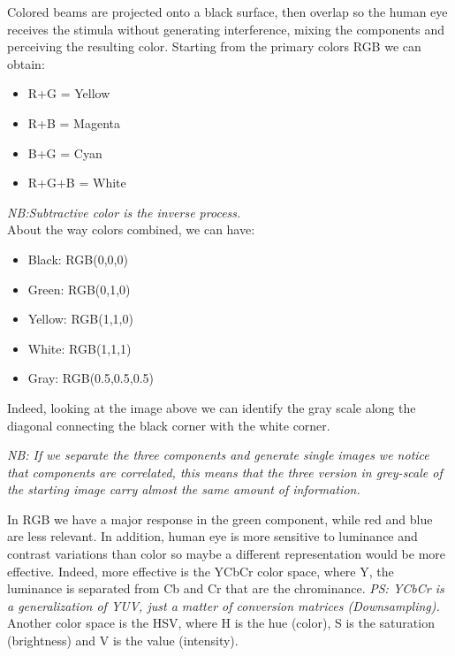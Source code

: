 Colored beams are projected onto a black surface, then overlap so the human eye receives the stimula without generating interference, mixing the components and perceiving the resulting color.
Starting from the primary colors RGB we can obtain:
\begin{itemize}
    \item R+G = Yellow
    \item R+B = Magenta
    \item B+G = Cyan
    \item R+G+B = White
\end{itemize}
\textit{NB:Subtractive color is the inverse process.}\\
About the way colors combined, we can have:
\begin{itemize}
    \item Black: RGB(0,0,0)
    \item Green: RGB(0,1,0)
    \item Yellow: RGB(1,1,0)
    \item White: RGB(1,1,1)
    \item Gray: RGB(0.5,0.5,0.5)
\end{itemize}

Indeed, looking at the image above we can identify the gray scale along the diagonal connecting the black corner with the white corner.

\textit{NB: If we separate the three components and generate single images we notice that components are correlated, this means that the three version in grey-scale of the starting image carry almost the same amount of information.}

In RGB we have a major response in the green component, while red and blue are less relevant. In addition, human eye is more sensitive to luminance and contrast variations than color so maybe a different representation would be more effective.
Indeed, more effective is the YCbCr color space, where Y, the luminance is separated from Cb and Cr that are the chrominance.
\textit{PS: YCbCr is a generalization of YUV, just a matter of conversion matrices (Downsampling).}
\\
Another color space is the HSV, where H is the hue (color), S is the saturation (brightness) and V is the value (intensity).

